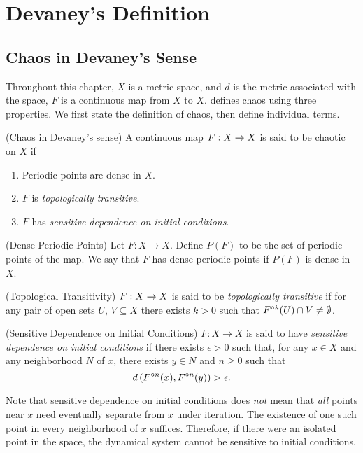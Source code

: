 \documentclass[12pt,draft,twoside]{book}
\begin{document}
\chapter{Devaney's Definition}
\label{chap:devaney}
\section{Chaos in Devaney's Sense}
Throughout this chapter, $X$ is a metric space, and $d$ is the metric associated with the space, $F$ is a continuous map from $X$ to $X$.
\citet{devaney} defines chaos using three properties.
We first state the definition of chaos, then define individual terms.
\begin{definition}
  (Chaos in Devaney's sense) 
  A continuous map $F: X\rightarrow X$ is said to be chaotic on $X$ if
  \begin{enumerate}
    \item Periodic points are dense in $X$.
    \item $F$ is \textit{topologically transitive}.
    \item $F$ has \textit{sensitive dependence on initial conditions}.
  \end{enumerate}
\end{definition}
%
\begin{definition}
  (Dense Periodic Points) 
  Let $F: X \to X$.
  Define $P(F)$ to be the set of periodic points of the map.
  We say that $F$ has dense periodic points if $P(F)$ is dense in $X$.
\end{definition}
%
\begin{definition}
  (Topological Transitivity) 
  $F: X \rightarrow X$ is said to be \textit{topologically transitive} if for any pair of open sets $U$, $V \subseteq X$ there exists $k > 0$ such that $F^{\circ k}(U) \cap V \neq \emptyset$.
  \label{defn:transitivity}
\end{definition}
%
\begin{definition}
  (Sensitive Dependence on Initial Conditions) 
  $F: X \rightarrow X$ is said to have \textit{sensitive dependence on initial conditions} if there exists $\epsilon > 0$ such that, for any $x \in X$ and any neighborhood $N$ of $x$, there exists $y\in N$ and $n\geq 0$ such that 
  \begin{equation*}
    d\left( F^{\circ n}(x), F^{\circ n}(y) \right) > \epsilon.
  \end{equation*}
  \label{defn:sdic}
\end{definition}
%
\begin{remark}
  Note that sensitive dependence on initial conditions does \textit{not} mean that \textit{all} points near $x$ need eventually separate from $x$ under iteration.
The existence of one such point in every neighborhood of $x$ suffices.
Therefore, if there were an isolated point in the space, the dynamical system cannot be sensitive to initial conditions.
\end{remark}
\end{document}
